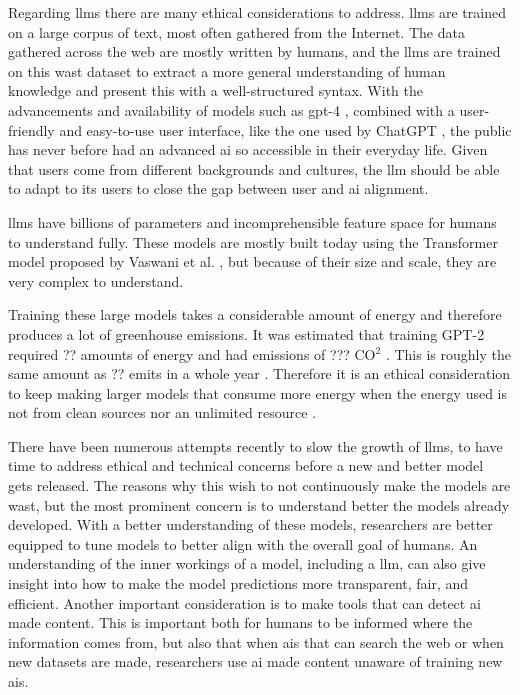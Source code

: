 Regarding \glspl{llm} there are many ethical considerations to address. \glspl{llm} are trained on a large corpus of text, most often gathered from the Internet. The data gathered across the web are mostly written by humans, and the \glspl{llm} are trained on this wast dataset to extract a more general understanding of human knowledge and present this with a well-structured syntax. With the advancements and availability of models such as \gls{gpt}-4 \cite{openaiGPT4TechnicalReport2023}, combined with a user-friendly and easy-to-use user interface, like the one used by ChatGPT \cite{ChatGPT}, the public has never before had an advanced \gls{ai} so accessible in their everyday life. Given that users come from different backgrounds and cultures, the \gls{llm} should be able to adapt to its users to close the gap between user and \gls{ai} alignment. 

\glspl{llm} have billions of parameters and incomprehensible feature space for humans to understand fully. These models are mostly built today using the Transformer model proposed by Vaswani et al. \cite{vaswaniAttentionAllYou2017}, but because of their size and scale, they are very complex to understand. 



Training these large models takes a considerable amount of energy and therefore produces a lot of greenhouse emissions. It was estimated that training GPT-2 required ?? amounts of energy and had emissions of ??? CO$^2$ \cite{}. This is roughly the same amount as ?? emits in a whole year \cite{}. Therefore it is an ethical consideration to keep making larger models that consume more energy when the energy used is not from clean sources nor an unlimited resource \cite{}.

There have been numerous attempts recently to slow the growth of \glspl{llm}, to have time to address ethical and technical concerns before a new and better model gets released. The reasons why this wish to not continuously make the models are wast, but the most prominent concern is to understand better the models already developed. With a better understanding of these models, researchers are better equipped to tune models to better align with the overall goal of humans. An understanding of the inner workings of a model, including a \gls{llm}, can also give insight into how to make the model predictions more transparent, fair, and efficient. Another important consideration is to make tools that can detect \gls{ai} made content. This is important both for humans to be informed where the information comes from, but also that when \glspl{ai} that can search the web or when new datasets are made, researchers use \gls{ai} made content unaware of training new \glspl{ai}.  

